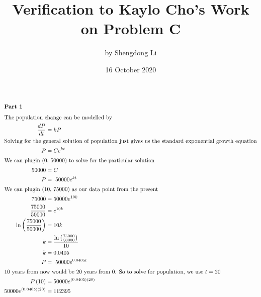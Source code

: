 \documentclass[12pt]{article}
\begin{document}
\title{Verification to Kaylo Cho's Work on Problem C}
\author{by Shengdong Li}
\date{16 October 2020}
\maketitle

\begin{align}
  \intertext{\textbf{Part 1}}
  \intertext{The population change can be modelled by}
  \frac{dP}{dt}                               & =kP                                                        \\
  \intertext{Solving for the general solution of population just gives us the standard exponential growth equation}
  P                                           & =Ce^{kt}                                                   \\
  \intertext{We can plugin (0, 50000) to solve for the particular solution}
  \ 50000                                     & =C                                                         \\
  P                                           & =\ 50000e^{kt}                                             \\
  \intertext{We can plugin (10, 75000) as our data point from the present}
  75000                                       & =50000e^{10k}                                              \\
  \frac{75000}{50000}                         & =e^{10k}                                                   \\
  \ln\left(\frac{75000}{50000}\right)         & =10k                                                       \\
  k                                           & =\frac{\ln\left(\frac{75000}{50000}\right)}{10}            \\
  k                                           & =0.0405                                                    \\
  P                                           & =\ 50000e^{0.0405t}                                        \\
  \intertext{10 years from now would be 20 years from 0. So to solve for population, we use $t=20$}
  P\left(10\right)                            & =50000e^{\left(0.0405\right)\left(20\right)}               \\
  50000e^{\left(0.0405\right)\left(20\right)} & =112395                                                    \\

\end{align}
\end{document}
